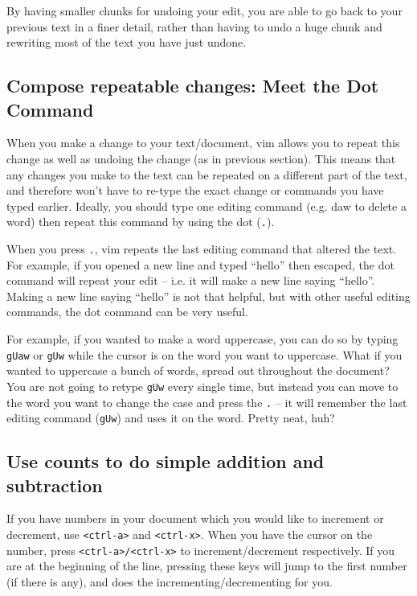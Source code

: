 By having smaller chunks for undoing your edit, you are able to go back to your previous text in a finer detail, rather than having to undo a huge chunk and rewriting most of the text you have just undone.

\subsection{Compose repeatable changes: Meet the Dot Command}

When you make a change to your text/document, vim allows you to repeat this change as well as undoing the change (as in previous section).
This means that any changes you make to the text can be repeated on a different part of the text, and therefore won't have to re-type the exact change or commands you have typed earlier.
Ideally, you should type one editing command (e.g. daw to delete a word) then repeat this command by using the dot (\verb|.|).

When you press \verb|.|, vim repeats the last editing command that altered the text.
For example, if you opened a new line and typed ``hello'' then escaped, the dot command will repeat your edit -- i.e. it will make a new line saying ``hello''.
Making a new line saying ``hello'' is not that helpful, but with other useful editing commands, the dot command can be very useful.

For example, if you wanted to make a word uppercase, you can do so by typing \verb|gUaw| or \verb|gUw| while the cursor is on the word you want to uppercase.
What if you wanted to uppercase a bunch of words, spread out throughout the document?
You are not going to retype \verb|gUw| every single time, but instead you can move to the word you want to change the case and press the \verb|.| -- it will remember the last editing command (\verb|gUw|) and uses it on the word.
Pretty neat, huh?

\subsection{Use counts to do simple addition and subtraction}

If you have numbers in your document which you would like to increment or decrement, use \verb|<ctrl-a>| and \verb|<ctrl-x>|.
When you have the cursor on the number, press \verb|<ctrl-a>/<ctrl-x>| to increment/decrement respectively.
If you are at the beginning of the line, pressing these keys will jump to the first number (if there is any), and does the incrementing/decrementing for you.

